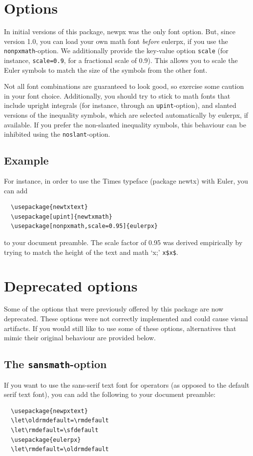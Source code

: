 \documentclass[11pt,a4paper,english]{article}
\newcommand*\pkg[1]{{\sf #1}}
\begin{document}

\section{Options}
In initial versions of this package, \pkg{newpx} was the only font option.
But, since version 1{.}0, you can load your own math font \emph{before} \pkg{eulerpx}, if you use the \verb|nonpxmath|-option.
We additionally provide the key-value option \verb|scale| (for instance, \verb|scale=0.9|, for a fractional scale of 0{.}9).
This allows you to scale the Euler symbols to match the size of the symbols from the other font.

Not all font combinations are guaranteed to look good, so exercise some caution in your font choice.
Additionally, you should try to stick to math fonts that include upright integrals (for instance, through an \verb|upint|-option), and slanted versions of the inequality symbols, which are selected automatically by \pkg{eulerpx}, if available.
If you prefer the non-slanted inequality symbols, this behaviour can be inhibited using the \verb|noslant|-option.

\subsection{Example}
For instance, in order to use the Times typeface (package \pkg{newtx}) with Euler, you can add
\begin{verbatim}
  \usepackage{newtxtext}
  \usepackage[upint]{newtxmath}
  \usepackage[nonpxmath,scale=0.95]{eulerpx}
\end{verbatim}
to your document preamble.
The scale factor of 0{.}95 was derived empirically by trying to match the height of the text and math `x;' \verb|x$x$|.

\section{Deprecated options}
Some of the options that were previously offered by this package are now deprecated.
These options were not correctly implemented and could cause visual artifacts.
If you would still like to use some of these options, alternatives that mimic their original behaviour are provided below.

\subsection{The {\tt sansmath}-option}
If you want to use the sans-serif text font for operators (as opposed to the default serif text font), you can add the following to your document preamble:
\begin{verbatim}
  \usepackage{newpxtext}
  \let\oldrmdefault=\rmdefault
  \let\rmdefault=\sfdefault
  \usepackage{eulerpx}
  \let\rmdefault=\oldrmdefault
\end{verbatim}
\end{document}
